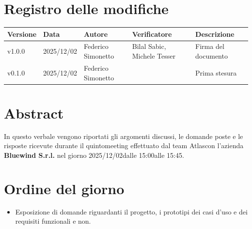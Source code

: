 \documentclass[a4paper,12pt]{article}
\newcommand{\Gruppo}{Atlas}
\newcommand{\DataVerbale}{2025/12/02}
\newcommand{\NumeroVerbaleEsterno}{quinto}
\newcommand{\OraInizio}{15:00}
\newcommand{\OraFine}{15:45}
\newcommand{\AbstractVerbale}{%
In questo verbale vengono riportati gli argomenti discussi, le domande poste e le risposte ricevute durante il \NumeroVerbaleEsterno \space meeting effettuato dal team \Gruppo \space con l'azienda \textbf{Bluewind S.r.l.} nel giorno \DataVerbale \space dalle \OraInizio \space alle \OraFine.
}
\newcommand{\VersioneVerbale}{v1.0.0} %
\begin{document}
\section*{Registro delle modifiche}{
    \begin{center} 
        \begin{tabular}{|l|l|l|l|l|}
        \hline
            \textbf{Versione} & \textbf{Data} & \textbf{Autore} & \textbf{Verificatore} & \textbf{Descrizione} \\
            \hline
            \VersioneVerbale & 2025/12/02 & Federico Simonetto & Bilal Sabic, Michele Tesser & Firma del documento \\
            \hline
            v0.1.0 & 2025/12/02 & Federico Simonetto &  & Prima stesura \\
            \hline
        \end{tabular}
    \end{center}
}

\newpage

\tableofcontents

\newpage
\section{Abstract}{
    \begin{minipage}{0.9\textwidth}
        \small
        \AbstractVerbale
    \end{minipage}
}


\section{Ordine del giorno}{
    \begin{itemize}
        \item Esposizione di domande riguardanti il progetto, i prototipi dei casi d'uso e dei requisiti funzionali e non.
    \end{itemize}
}
\end{document}
